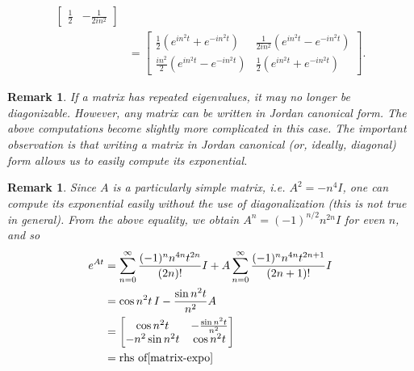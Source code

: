 \documentclass[12pt,reqno]{amsart}
\numberwithin{equation}{section}  %
\renewcommand{\cref}{\Cref}
\newtheorem{remark}[theorem]{Remark}
\begin{document}
\begin{appendices}
\begin{equation}
\begin{split}
\begin{bmatrix}
    \frac{1}{2} & -\frac{1}{2i n^{2}}
  \end{bmatrix}
  \\
  & =
  \begin{bmatrix}
    \frac{1}{2}(e^{in^{2}t} + e^{-in^{2}t}) & \frac{1}{2 i n^{2}} (e^{in^{2}t} -
    e^{-in^{2}t})    \\
    \frac{in^{2}}{2}(e^{in^{2}t} - e^{-in^{2}t}) & \frac{1}{2}(e^{in^{2}t} +
    e^{-in^{2}t})
  \end{bmatrix}.
\end{split}
\end{equation}
%
%
\begin{framed}
\begin{remark}
If a matrix has repeated eigenvalues, it may no longer be diagonizable. However,
any matrix can be written in Jordan canonical form. The above computations
become slightly more complicated in this case. The important observation is that
writing a matrix in Jordan canonical (or, ideally, diagonal) form allows us to
easily compute its exponential. 
\label{rem:jordan-form}
\end{remark}
\end{framed}
%
%
%
%
\begin{framed}
\begin{remark}
\label{rem:simpler-comp}
  Since $A$ is a particularly simple matrix, i.e. $A^{2} = -n^{4} I$, one can
  compute its exponential easily without the use of diagonalization (this is
  not true in general). From the above equality, we obtain $A^{n} =
  (-1)^{n/2} n^{2n} I$ for even $n$, and so
  \begin{equation*}
  \begin{split}
    e^{At}
    & = \sum_{n=0}^{\infty} \frac{(-1)^{n}n^{4n}t^{2n}}{(2n)!}I + A
    \sum_{n=0}^{\infty} \frac{(-1)^{n} n^{4n} t^{2n + 1}}{(2n + 1)!} I 
    \\
    & = \cos n^{2}t \, I - \frac{\sin n^{2}t}{n^{2}}A
    \\
    & = 
    \begin{bmatrix}
      \cos n^{2}t &  -\frac{\sin n^{2}t}{n^{2}}
      \\
      - n^{2} \sin n^{2}t & \cos n^{2}t
    \end{bmatrix}
    \\
    & = \text{rhs of}\cref{matrix-expo}
  \end{split}
  \end{equation*}
\end{remark}
\end{framed}

\end{appendices}
\end{document}
